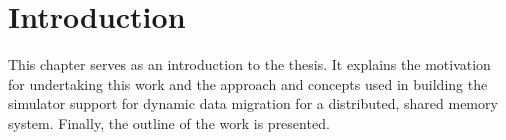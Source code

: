 \documentclass{listhesis}
\begin{document}
\maketitle
\cleardoublepage

\makeabstract
\clearpage

\tableofcontents
\clearpage
\listoffigures
\clearpage
\listoftables
\clearpage


\chapter{Introduction}
This chapter serves as an introduction to the thesis. It explains the motivation for undertaking this work and the approach and concepts used in building the simulator support for dynamic data migration for a distributed, shared memory system. Finally, the outline of the work is presented.
\end{document}

